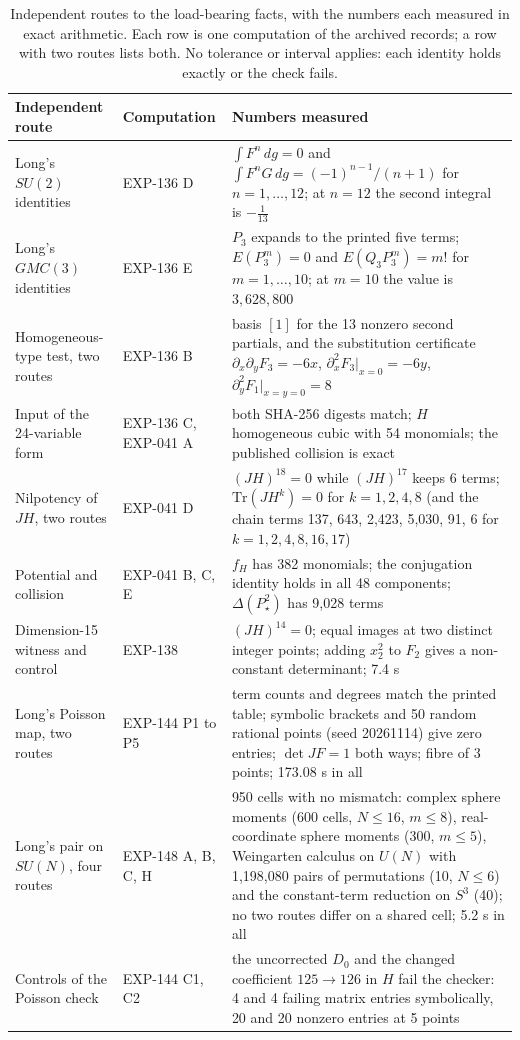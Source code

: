 \begin{table}[t]
\centering\footnotesize
\setlength{\tabcolsep}{3pt}
\begin{tabular}{@{}L{0.22\textwidth}L{0.15\textwidth}L{0.60\textwidth}@{}}
\toprule
Independent route & Computation & Numbers measured \\
\midrule
Long's $SU(2)$ identities & EXP-136 D & $\int F^n\,dg=0$ and $\int F^nG\,dg=(-1)^{n-1}/(n+1)$ for $n=1,\dots,12$; at $n=12$ the second integral is $-\tfrac{1}{13}$ \\[2pt]
Long's $GMC(3)$ identities & EXP-136 E & $P_3$ expands to the printed five terms; $E(P_3^m)=0$ and $E(Q_3P_3^m)=m!$ for $m=1,\dots,10$; at $m=10$ the value is $3{,}628{,}800$ \\[2pt]
Homogeneous-type test, two routes & EXP-136 B & basis $[1]$ for the 13 nonzero second partials, and the substitution certificate $\partial_x\partial_yF_3=-6x$, $\partial_x^2F_3|_{x=0}=-6y$, $\partial_y^2F_1|_{x=y=0}=8$ \\[2pt]
Input of the 24-variable form & EXP-136 C, EXP-041 A & both SHA-256 digests match; $H$ homogeneous cubic with 54 monomials; the published collision is exact \\[2pt]
Nilpotency of $JH$, two routes & EXP-041 D & $(JH)^{18}=0$ while $(JH)^{17}$ keeps 6 terms; $\mathrm{Tr}(JH^k)=0$ for $k=1,2,4,8$ (and the chain terms 137, 643, 2{,}423, 5{,}030, 91, 6 for $k=1,2,4,8,16,17$) \\[2pt]
Potential and collision & EXP-041 B, C, E & $f_H$ has 382 monomials; the conjugation identity holds in all 48 components; $\Delta(P_\star^2)$ has 9{,}028 terms \\[2pt]
Dimension-15 witness and control & EXP-138 & $(JH)^{14}=0$; equal images at two distinct integer points; adding $x_2^2$ to $F_2$ gives a non-constant determinant; 7.4 s \\[2pt]
Long's Poisson map, two routes & EXP-144 P1 to P5 & term counts and degrees match the printed table; symbolic brackets and 50 random rational points (seed 20261114) give zero entries; $\det JF=1$ both ways; fibre of 3 points; 173.08 s in all \\[2pt]
Long's pair on $SU(N)$, four routes & EXP-148 A, B, C, H & 950 cells with no mismatch: complex sphere moments (600 cells, $N\le16$, $m\le8$), real-coordinate sphere moments (300, $m\le5$), Weingarten calculus on $U(N)$ with 1{,}198{,}080 pairs of permutations (10, $N\le6$) and the constant-term reduction on $S^3$ (40); no two routes differ on a shared cell; 5.2 s in all \\[2pt]
Controls of the Poisson check & EXP-144 C1, C2 & the uncorrected $D_0$ and the changed coefficient $125\to126$ in $H$ fail the checker: 4 and 4 failing matrix entries symbolically, 20 and 20 nonzero entries at 5 points \\[2pt]
\bottomrule
\end{tabular}
\caption{Independent routes to the load-bearing facts, with the numbers each measured in exact arithmetic. Each row is one computation of the archived records; a row with two routes lists both. No tolerance or interval applies: each identity holds exactly or the check fails.}
\label{tab:validation}
\end{table}
